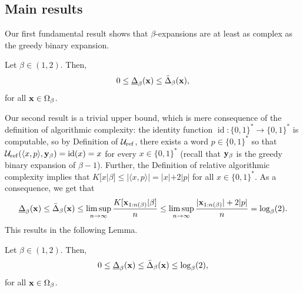 	\subsection{Main results}
	Our first fundamental result shows that $\beta$-expansions are at least as complex as the greedy binary expansion.
	\begin{theorem}\label{thm:binary expansions are at least as compressible as as beta expansions}
		Let $\beta \in (1,2)$. Then,
		\begin{equation}
			0 \leq \underline\Delta_\beta({\bf x}) \leq \bar\Delta_\beta({\bf x}),
		\end{equation}
		for all ${\bf x} \in \Omega_\beta$.
	\end{theorem}
	Our second result is a trivial upper bound, which is mere consequence of the definition of algorithmic complexity: the identity function $\operatorname{id} : \{0,1\}^\ast \to \{0,1\}^\ast$ is computable, so by Definition of $\mathcal{U}_{\operatorname{ref}}$, there exists a word $p \in \{0,1\}^\ast$ so that $\mathcal{U}_{\operatorname{ref}}(\langle x, p \rangle, {\bf y}_\beta) = \operatorname{id}(x) = x$ for every $x \in \{0,1\}^\ast$ (recall that ${\bf y}_\beta$ is the greedy binary expansion of $\beta - 1$). Further, the Definition of relative algorithmic complexity implies that $K[x|\beta] \leq |\langle x,p\rangle| = |x| + 2|p|$ for all $x \in \{0,1\}^\ast$. As a consequence, we get that
	\begin{equation}
		\underline\Delta_\beta({\bf x}) \leq \bar\Delta_\beta({\bf x}) \leq  \limsup_{n \to \infty} \frac{K[{\bf x}_{1:n(\beta)}|\beta]}{n} \leq \limsup_{n \to \infty} \frac{|{\bf x}_{1:n(\beta)}| + 2|p|}{n} = \log_\beta(2).
	\end{equation}
	This results in the following Lemma.
	\begin{lemma}\label{lem:trivial upper bound on the relative compressibility of beta expansions}
		Let $\beta \in (1,2)$. Then,
		\begin{equation}
			0 \leq \underline\Delta_\beta({\bf x}) \leq \bar\Delta_\beta({\bf x}) \leq \log_\beta(2),
		\end{equation}
		for all ${\bf x} \in \Omega_\beta$.
	\end{lemma}
